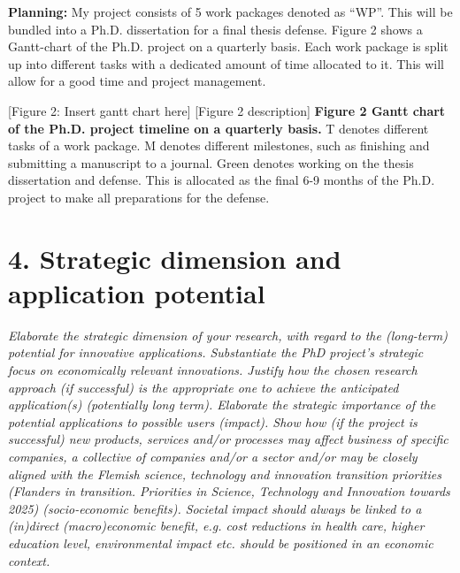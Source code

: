 \documentclass[11pt]{article}
\begin{document}
\textbf{Planning:}
My project consists of 5 work packages denoted as “WP”. 
This will be bundled into a Ph.D. dissertation for a final thesis defense. Figure 2 shows a Gantt-chart of the Ph.D. project on a quarterly basis.  
Each work package is split up into different tasks with a dedicated amount of time allocated to it. 
This will allow for a good time and project management. 

[Figure 2: Insert gantt chart here]
[Figure 2 description]
\textbf{Figure 2 Gantt chart of the Ph.D. project timeline on a quarterly basis.} T denotes different tasks of a work package. M denotes different milestones, such as finishing and submitting a manuscript to a journal. 
Green denotes working on the thesis dissertation and defense. 
This is allocated as the final 6-9 months of the Ph.D. project to make all preparations for the defense. 


\section{4. Strategic dimension and application potential}
\textit{Elaborate the strategic dimension of your research, with regard to the (long-term) potential for innovative applications. 
Substantiate the PhD project’s strategic focus on economically relevant innovations. Justify how the chosen research approach (if successful) is the appropriate one to achieve the anticipated application(s) (potentially long term).
Elaborate the strategic importance of the potential applications to possible users (impact). Show how (if the project is successful) new products, services and/or processes may affect business of specific companies, a collective of companies and/or a sector and/or may be closely aligned with the Flemish science, technology and innovation transition priorities  (Flanders in transition. Priorities in Science, Technology and Innovation towards 2025) (socio-economic benefits). Societal impact should always be linked to a (in)direct (macro)economic benefit, e.g. cost reductions in health care, higher education level, environmental impact etc. should be positioned in an economic context.}
\end{document}
